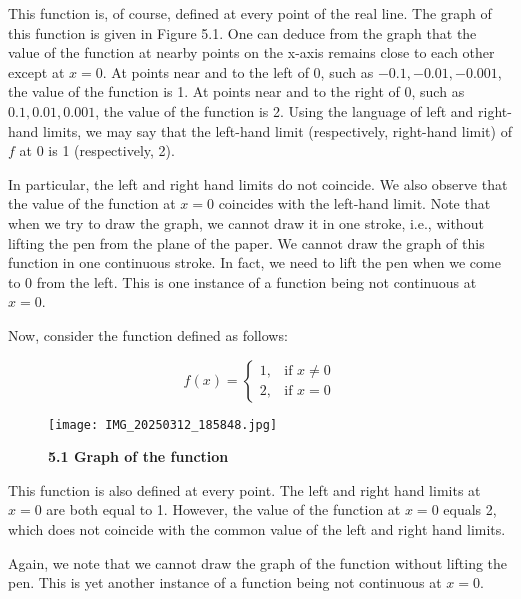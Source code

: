 									     This function is, of course, defined at every point of the real line. The graph of this function is given in Figure 5.1. One can deduce from the graph that the value of the function at nearby points on the x-axis remains close to each other except at \( x = 0 \). At points near and to the left of 0, such as \(-0.1, -0.01, -0.001\), the value of the function is 1. At points near and to the right of 0, such as \(0.1, 0.01, 0.001\), the value of the function is 2.
									     \vspace{5cm}
									     Using the language of left and right-hand limits, we may say that the left-hand limit (respectively, right-hand limit) of \( f \) at \( 0 \) is 1 (respectively, 2). 

									     In particular, the left and right hand limits do not coincide. We also observe that the value of the function at \( x = 0 \) coincides with the left-hand limit. Note that when we try to draw the graph, we cannot draw it in one stroke, i.e., without lifting the pen from the plane of the paper. We cannot draw the graph of this function in one continuous stroke. In fact, we need to lift the pen when we come to 0 from the left. This is one instance of a function being not continuous at \( x = 0 \).

									     Now, consider the function defined as follows:

									     \[
									     f(x) =
									     \begin{cases}
									     1, & \text{if } x \neq 0 \\
									     2, & \text{if } x = 0
									     \end{cases}
									     \]

									     \begin{wrapfigure}{r}{0.4\textwidth}
									     \centering
									     \vspace{-2mm}
									     \texttt{[image: IMG\_20250312\_185848.jpg]} 
									     \caption\textbf{5.1 Graph of the function}
									     \end{wrapfigure}

									        \hspace{1cm} This function is also defined at every point. The left and right hand limits at \( x = 0 \) are both equal to 1. However, the value of the function at \( x = 0 \) equals 2, which does not coincide with the common value of the left and right hand limits.    

										\hspace{1cm} 
										Again, we note that we cannot draw the graph of the function without lifting the pen. This is yet another instance of a function being not continuous at \( x = 0 \).

